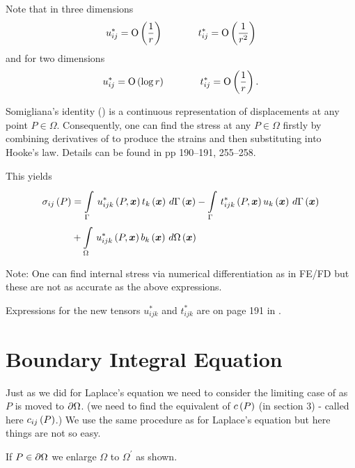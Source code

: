 Note that in three dimensions
\begin{displaymath}
  u_{ij}^{*} =  \mathrm{O}\left( \frac{1}{r} \right) \hspace{0.5in} t_{ij}^{*} = 
   \mathrm{O}\left( \frac{1}{r^{2}} \right) 
\end{displaymath}
 and for two dimensions
\begin{displaymath}
  u_{ij}^{*} =  \mathrm{O}\left( \log r \right) \hspace{0.5in}  t_{ij}^{*} =  \mathrm{O}\left( \frac{1}{r} \right) .
\end{displaymath}


Somigliana's identity () is a continuous representation of
displacements at any point $P \in \Omega$.  Consequently, one can find the
stress at any $P \in \Omega$ firstly by combining derivatives of
 to produce the strains and then substituting into Hooke's law.
Details can be found in  pp 190--191, 255--258.

This yields
\begin{align*}
  \fnof{\sigma_{ij}}{P} &= \gint{\Gamma}{}{\fnof{u_{ijk}^{*}}{P,\vect{x}}
    \fnof{t_{k}}{\vect{x}}}{\fnof{\Gamma}{\vect{x}}} -
    \gint{\Gamma}{}{\fnof{t_{ijk}^{*}}{P,\vect{x}}
    \fnof{u_{k}}{\vect{x}}}{\fnof{\Gamma}{\vect{x}}} \\ 
  &+ \gint{\Omega}{}{\fnof{u_{ijk}^{*}}{P,\vect{x}}
    \fnof{b_{k}}{\vect{x}}}{\fnof{\Omega}{\vect{x}}}
\end{align*}

Note: One can find internal stress via numerical differentiation as in FE/FD
but these are not as accurate as the above expressions.

Expressions for the new tensors $ u_{ijk}^{*}$ and $t_{ijk}^{*}$ are on page
191 in \cite{brebbia:1984}.

\section{Boundary Integral Equation}
\label{sec:BIE,sec4.10}

Just as we did for Laplace's equation we need to consider the limiting case of
 as $P$ is moved to $\partial \Omega$. (\ie we need to find the
equivalent of $ c\left( P \right) $ (in section 3) - called here $ c_{ij}\left( P \right) $.)
We use the same procedure as for Laplace's equation but here things are not so
easy.

If  $P \in \partial \Omega$ we enlarge $\Omega$ to $\Omega^{\prime}$ as 
shown.

